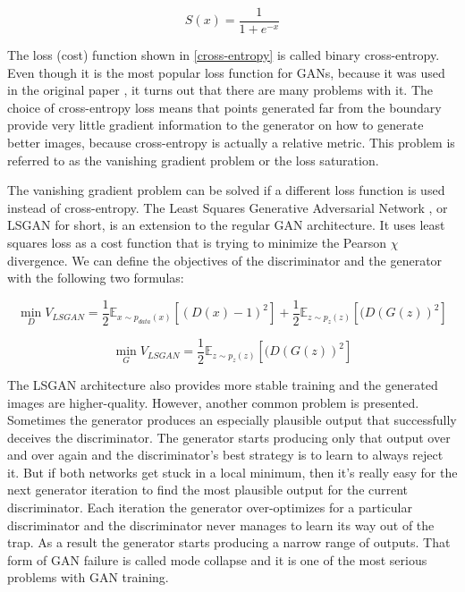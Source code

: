 \documentclass{article}
\begin{document}
\begin{equation}
    S(x) = \frac{1}{1+e^{-x}}
\end{equation}

The loss (cost) function shown in \eqref{cross-entropy} is called binary cross-entropy. Even though it is the most popular loss function for GANs, because it was used in the original paper \cite{goodfellow2014generative}, it turns out that there are many problems with it. The choice of cross-entropy loss means that points generated far from the boundary provide very little gradient information to the generator on how to generate better images, because cross-entropy is actually a relative metric. This problem is referred to as the vanishing gradient problem or the loss saturation. 

The vanishing gradient problem can be solved if a different loss function is used instead of cross-entropy. The Least Squares Generative Adversarial Network \cite{mao2016squares}, or LSGAN for short, is an extension to the regular GAN architecture. It uses least squares loss as a cost function that is trying to minimize the Pearson $\chi$ divergence. We can define the objectives of the discriminator and the generator with the following two formulas:

\begin{equation}
\min_D{V_{LSGAN}} = \frac{1}{2}\mathbb{E}_{x\sim p_{data}(x)}[(D(x) - 1)^2] + \frac{1}{2}\mathbb{E}_{z\sim p_{z}(z)}[(D(G(z))^2]
\end{equation}

\begin{equation}
\min_G{V_{LSGAN}} = \frac{1}{2}\mathbb{E}_{z\sim p_{z}(z)}[(D(G(z))^2]
\end{equation} 

The LSGAN architecture also provides more stable training and the generated images are higher-quality. However, another common problem is presented. Sometimes the generator produces an especially plausible output that successfully deceives the discriminator. The generator starts producing only that output over and over again and the discriminator's best strategy is to learn to always reject it. But if both networks get stuck in a local minimum, then it's really easy for the next generator iteration to find the most plausible output for the current discriminator. Each iteration the generator over-optimizes for a particular discriminator and the discriminator never manages to learn its way out of the trap. As a result the generator starts producing a narrow range of outputs. That form of GAN failure is called mode collapse and it is one of the most serious problems with GAN training.
\end{document}
